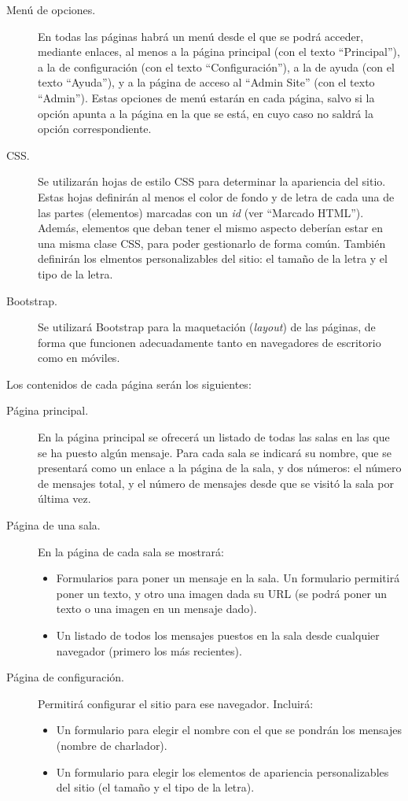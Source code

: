 \begin{description}
\item[Menú de opciones.] En todas las páginas habrá un menú desde el que se podrá acceder, mediante enlaces, al menos a la página principal (con el texto ``Principal''), a la de configuración (con el texto ``Configuración''), a la de ayuda (con el texto ``Ayuda''), y a la página de acceso al ``Admin Site'' (con el texto ``Admin''). Estas opciones de menú estarán en cada página, salvo si la opción apunta a la página en la que se está, en cuyo caso no saldrá la opción correspondiente.

\item[CSS.] Se utilizarán hojas de estilo CSS para determinar la apariencia del sitio. Estas hojas definirán al menos el color de fondo y de letra de cada una de las partes (elementos) marcadas con un \emph{id} (ver ``Marcado HTML''). Además, elementos que deban tener el mismo aspecto deberían estar en una misma clase CSS, para poder gestionarlo de forma común. También definirán los elmentos personalizables del sitio: el tamaño de la letra y el tipo de la letra.

\item[Bootstrap.] Se utilizará Bootstrap para la maquetación (\emph{layout}) de las páginas, de forma que funcionen adecuadamente tanto en navegadores de escritorio como en móviles.
\end{description}

Los contenidos de cada página serán los siguientes:

\begin{description}
\item[Página principal.] En la página principal se ofrecerá un listado de todas las salas en las que se ha puesto algún mensaje. Para cada sala se indicará su nombre, que se presentará como un enlace a la página de la sala, y dos números: el número de mensajes total, y el número de mensajes desde que se visitó la sala por última vez.
\item[Página de una sala.] En la página de cada sala se mostrará:
  \begin{itemize}
  \item Formularios para poner un mensaje en la sala. Un formulario permitirá poner un texto, y otro una imagen dada su URL (se podrá poner un texto o una imagen en un mensaje dado).
  \item Un listado de todos los mensajes puestos en la sala desde cualquier navegador (primero los más recientes).
  \end{itemize}
\item[Página de configuración.] Permitirá configurar el sitio para ese navegador. Incluirá:
  \begin{itemize}
  \item Un formulario para elegir el nombre con el que se pondrán los mensajes (nombre de charlador).
  \item Un formulario para elegir los elementos de apariencia personalizables del sitio (el tamaño y el tipo de la letra).
  \end{itemize}
\end{description}

